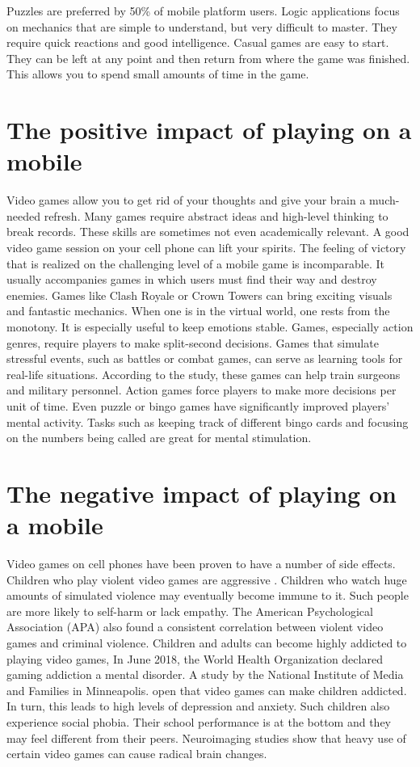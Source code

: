 \documentclass[10pt,oneside,a4paper]{article}
\begin{document}
Puzzles are preferred by 50\% of mobile platform users. Logic applications focus on mechanics that are simple to understand, but very difficult to master. They require quick reactions and good intelligence.
Casual games are easy to start. They can be left at any point and then return from where the game was finished. This allows you to spend small amounts of time in the game.\cite{Now}

\section*{The positive impact of playing on a mobile}
Video games allow you to get rid of your thoughts and give your brain a much-needed refresh. Many games require abstract ideas and high-level thinking to break records. These skills are sometimes not even academically relevant.
A good video game session on your cell phone can lift your spirits. The feeling of victory that is realized on the challenging level of a mobile game is incomparable. It usually accompanies games in which users must find their way and destroy enemies. Games like Clash Royale or Crown Towers can bring exciting visuals and fantastic mechanics.
When one is in the virtual world, one rests from the monotony. It is especially useful to keep emotions stable.
Games, especially action genres, require players to make split-second decisions. Games that simulate stressful events, such as battles or combat games, can serve as learning tools for real-life situations. According to the study, these games can help train surgeons and military personnel. Action games force players to make more decisions per unit of time.
Even puzzle or bingo games have significantly improved players' mental activity. Tasks such as keeping track of different bingo cards and focusing on the numbers being called are great for mental stimulation.\cite{Good} 

\section*{The negative impact of playing  on a mobile}
Video games on cell phones have been proven to have a number of side effects. 
Children who play violent video games are aggressive . Children who watch huge amounts of simulated violence may eventually become immune to it. Such people are more likely to self-harm or lack empathy. The American Psychological Association (APA) also found a consistent correlation between violent video games and criminal violence.
Children and adults can become highly addicted to playing video games, In June 2018, the World Health Organization declared gaming addiction a mental disorder. A study by the National Institute of Media and Families in Minneapolis. open that video games can make children addicted. In turn, this leads to high levels of depression and anxiety.
Such children also experience social phobia. Their school performance is at the bottom and they may feel different from their peers. Neuroimaging studies show that heavy use of certain video games can cause radical brain changes.\cite{Bad} 


 
\end{document}
